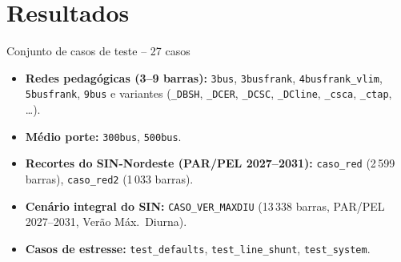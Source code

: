 \documentclass{libs/ufc_format}
\begin{document}
\section{Resultados}

\begin{frame}{Conjunto de casos de teste -- 27 casos}
    \begin{itemize}
        \item \textbf{Redes pedagógicas (3--9 barras):} \texttt{3bus}, \texttt{3busfrank}, \texttt{4busfrank\_vlim}, \texttt{5busfrank}, \texttt{9bus} e variantes (\texttt{\_DBSH}, \texttt{\_DCER}, \texttt{\_DCSC}, \texttt{\_DCline}, \texttt{\_csca}, \texttt{\_ctap}, \dots).
        \item \textbf{Médio porte:} \texttt{300bus}, \texttt{500bus}.
        \item \textbf{Recortes do SIN-Nordeste (PAR/PEL 2027--2031):} \texttt{caso\_red} (2\,599 barras), \texttt{caso\_red2} (1\,033 barras).
        \item \textbf{Cenário integral do SIN:} \texttt{CASO\_VER\_MAXDIU} (13\,338 barras, PAR/PEL 2027--2031, Verão Máx.\ Diurna).
        \item \textbf{Casos de estresse:} \texttt{test\_defaults}, \texttt{test\_line\_shunt}, \texttt{test\_system}.
    \end{itemize}

    \vspace{0.3cm}
\end{frame}

\end{document}
